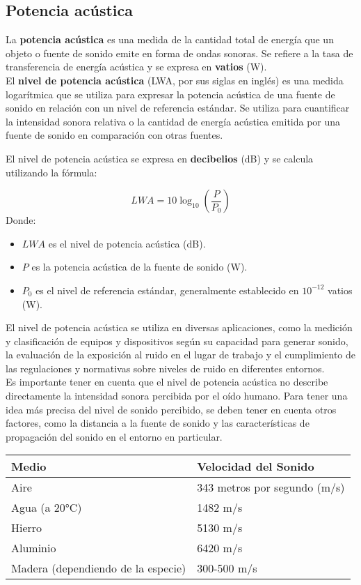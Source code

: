 \documentclass[
	12pt, %
	fleqn, %
	a4paper, %
	oneside, %
]{LegrandOrangeBook}
\begin{document}
\subsection{Potencia acústica}
La \textbf{potencia acústica} es una medida de la cantidad total de energía que un objeto o fuente de sonido emite en forma de ondas sonoras. Se refiere a la tasa de transferencia de energía acústica y se expresa en \textbf{vatios} (W).\\
El \textbf{nivel de potencia acústica} (LWA, por sus siglas en inglés) es una medida logarítmica que se utiliza para expresar la potencia acústica de una fuente de sonido en relación con un nivel de referencia estándar. Se utiliza para cuantificar la intensidad sonora relativa o la cantidad de energía acústica emitida por una fuente de sonido en comparación con otras fuentes.
\begin{definition}
El nivel de potencia acústica se expresa en \textbf{decibelios} (dB) y se calcula utilizando la fórmula:

\begin{equation}
LWA = 10 \log_{10}\left(\frac{P}{P_0}\right)
\end{equation}
Donde:
\begin{itemize}
    \item $LWA$ es el nivel de potencia acústica (dB).
    \item $P$ es la potencia acústica de la fuente de sonido (W).
    \item $P_0$ es el nivel de referencia estándar, generalmente establecido en $10^{-12}$ vatios (W).
\end{itemize}
\end{definition}
El nivel de potencia acústica se utiliza en diversas aplicaciones, como la medición y clasificación de equipos y dispositivos según su capacidad para generar sonido, la evaluación de la exposición al ruido en el lugar de trabajo y el cumplimiento de las regulaciones y normativas sobre niveles de ruido en diferentes entornos.\\
Es importante tener en cuenta que el nivel de potencia acústica no describe directamente la intensidad sonora percibida por el oído humano. Para tener una idea más precisa del nivel de sonido percibido, se deben tener en cuenta otros factores, como la distancia a la fuente de sonido y las características de propagación del sonido en el entorno en particular.
\begin{tabular}{ll}
\toprule
\textbf{Medio} & \textbf{Velocidad del Sonido} \\
\midrule
Aire & 343 metros por segundo (m/s) \\
Agua (a 20°C) & 1482 m/s \\
Hierro & 5130 m/s \\
Aluminio & 6420 m/s \\
Madera (dependiendo de la especie) & 300-500 m/s \\
\bottomrule
\end{tabular}
\end{document}
